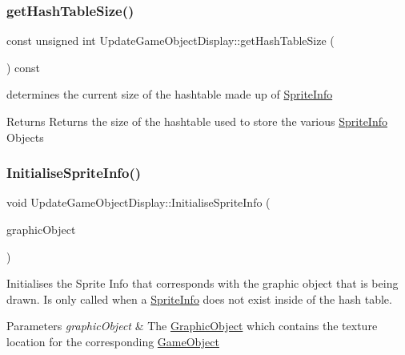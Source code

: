 \subsubsection{\texorpdfstring{get\+Hash\+Table\+Size()}{getHashTableSize()}}
{\footnotesize\ttfamily const unsigned int Update\+Game\+Object\+Display\+::get\+Hash\+Table\+Size (\begin{DoxyParamCaption}{ }\end{DoxyParamCaption}) const\hspace{0.3cm}{\ttfamily [inline]}}



determines the current size of the hashtable made up of \hyperlink{struct_sprite_info}{Sprite\+Info} 

\begin{DoxyReturn}{Returns}
Returns the size of the hashtable used to store the various \hyperlink{struct_sprite_info}{Sprite\+Info} Objects 
\end{DoxyReturn}
\mbox{\label{class_update_game_object_display_ab9405bbbabaa083cfdaefbbe84cb7cd4}} 
\subsubsection{\texorpdfstring{Initialise\+Sprite\+Info()}{InitialiseSpriteInfo()}}
{\footnotesize\ttfamily void Update\+Game\+Object\+Display\+::\+Initialise\+Sprite\+Info (\begin{DoxyParamCaption}\item[{const \hyperlink{class_graphic_object}{Graphic\+Object} \&}]{graphic\+Object }\end{DoxyParamCaption})\hspace{0.3cm}{\ttfamily [private]}}



Initialises the Sprite Info that corresponds with the graphic object that is being drawn. Is only called when a \hyperlink{struct_sprite_info}{Sprite\+Info} does not exist inside of the hash table. 


\begin{DoxyParams}{Parameters}
{\em graphic\+Object} & The \hyperlink{class_graphic_object}{Graphic\+Object} which contains the texture location for the corresponding \hyperlink{class_game_object}{Game\+Object} \\
\hline
\end{DoxyParams}
\mbox{\label{class_update_game_object_display_a05f0b24dfb3e2206b0d363dbc5127139}} 

